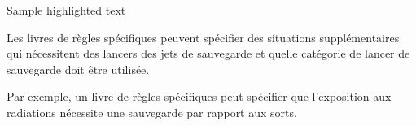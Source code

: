 \documentclass[]{ose}
\begin{document}
\blindtext

\begin{highlight}
    Sample highlighted text
\end{highlight}

\blindtext\blindtext

\begin{highlight}
    Les livres de règles spécifiques peuvent spécifier des situations supplémentaires qui nécessitent des lancers des jets de sauvegarde  et quelle catégorie de lancer de sauvegarde
    doit être utilisée.

    Par exemple, un livre de règles spécifiques peut spécifier que l’exposition aux radiations
    nécessite une sauvegarde par rapport aux sorts.
\end{highlight}

\blindtext\blindtext
\blindtext

\Blinddocument
\end{document}
